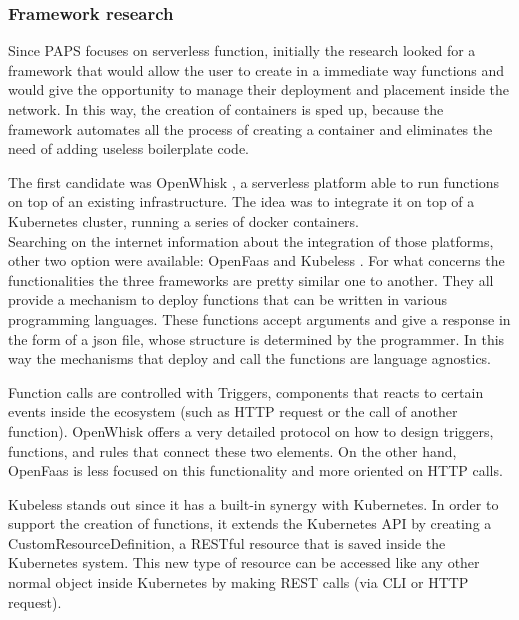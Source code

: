 \subsubsection*{Framework research}


Since PAPS focuses on serverless function, initially the research looked for a framework 
that would allow the user to create in a immediate way functions and would give the opportunity to manage their
deployment and placement inside the network.
In this way, the creation of containers is sped up, because the framework automates all the process
of creating a container and eliminates the need of adding useless boilerplate code.
\par
The first candidate was OpenWhisk \cite{OpenWhisk}, a serverless platform able to run 
functions on top of an existing infrastructure. The idea was to integrate it on top of a Kubernetes 
cluster, running a series of docker \cite{Docker} containers. \\
Searching on the internet information about the integration of those platforms, other two 
option were available: OpenFaas \cite{Faas} and Kubeless \cite{Kubeless}. For what concerns 
the functionalities the three frameworks are pretty similar one to another.
They all provide a mechanism to deploy functions that can be written in various programming languages.
These functions accept arguments and give a response in the form of a json file, whose structure
is determined by the programmer. In this way the mechanisms that deploy and call the functions are language agnostics.
\par
Function calls are controlled with Triggers, components that reacts to certain events inside the 
ecosystem (such as HTTP request or the call of another function).
OpenWhisk offers a very detailed protocol on how to design triggers, functions, and rules
that connect these two elements.
On the other hand, OpenFaas is less focused on this functionality and more oriented on HTTP calls.
\par
Kubeless stands out since it has a built-in synergy with Kubernetes. In order to support the creation of functions, 
it extends the Kubernetes API by creating a CustomResourceDefinition, a RESTful resource that is saved inside the Kubernetes
system. This new type of resource can be accessed like any other normal object inside Kubernetes
by making REST calls (via CLI or HTTP request).

